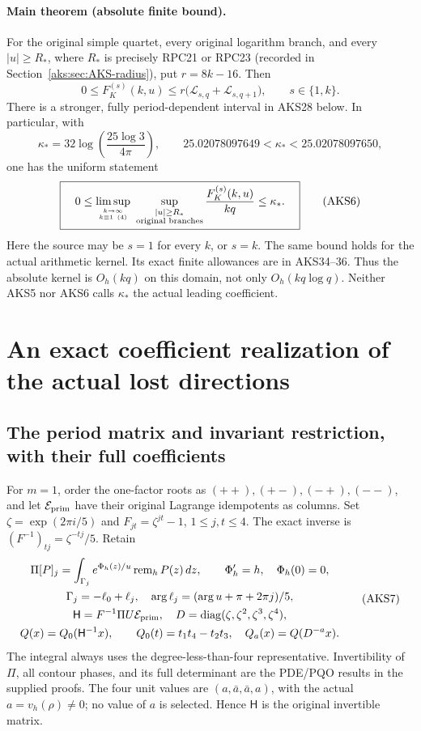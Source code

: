 \paragraph{Main theorem (absolute finite bound).}
For the original simple quartet, every original logarithm branch, and
every $|u|\ge R_*$, where $R_*$ is precisely RPC21 or RPC23 (recorded in
Section~\ref{aks:sec:AKS-radius}), put $r=8k-16$. Then
\[
 \boxed{\quad
 0\le F_K^{(s)}(k,u)\le r\bigl(\mathcal L_{s,q}+\mathcal L_{s,q+1}\bigr),
 \qquad s\in\{1,k\}.\quad}
 \tag{AKS4}
\]
There is a stronger, fully period-dependent interval in AKS28 below.
In particular, with
\[
 \kappa_* =32\log\left(\frac{25\log3}{4\pi}\right),
 \qquad 25.02078097649<\kappa_*<25.02078097650,
 \tag{AKS5}
\]
one has the uniform statement
\[
 \boxed{\quad
 0\le\limsup_{k\to\infty\atop k\equiv1\ (4)}
       \ \sup_{\substack{|u|\ge R_*\\\text{original branches}}}
         \frac{F_K^{(s)}(k,u)}{kq}\le\kappa_*.
 \quad}\tag{AKS6}
\]
Here the source may be $s=1$ for every $k$, or $s=k$. The same bound holds
for the actual arithmetic kernel. Its exact finite allowances are in
AKS34--36. Thus the absolute kernel is $O_h(kq)$ on this domain, not only
$O_h(kq\log q)$. Neither AKS5 nor AKS6 calls $\kappa_*$ the actual leading
coefficient.

\section{An exact coefficient realization of the actual lost directions}
\label{aks:sec:AKS-frame}

\subsection{The period matrix and invariant restriction, with their full coefficients}
For $m=1$, order the one-factor roots as $(++),(+-),(-+),(--)$, and let
$\mathcal E_{\rm prim}$ have their original Lagrange idempotents as columns.
Set $\zeta=\exp(2\pi i/5)$ and $F_{jt}=\zeta^{jt}-1$, $1\le j,t\le4$.
The exact inverse is $(F^{-1})_{tj}=\zeta^{-tj}/5$. Retain
\[
\begin{gathered}
 \Pi[P]_j=\int_{\Gamma_j}e^{\Phi_h(z)/u}\operatorname{rem}_hP(z)\,dz,
 \qquad\Phi_h'=h,\quad\Phi_h(0)=0,\\
 \Gamma_j=-\ell_0+\ell_j,\quad
 \arg\ell_j=(\arg u+\pi+2\pi j)/5,\\
 \mathsf H=F^{-1}\Pi U\mathcal E_{\rm prim},\quad
 D=\operatorname{diag}(\zeta,\zeta^2,\zeta^3,\zeta^4),\\
 Q(x)=Q_0(\mathsf H^{-1}x),\qquad
 Q_0(t)=t_1t_4-t_2t_3,\quad Q_a(x)=Q(D^{-a}x).
\end{gathered}\tag{AKS7}
\]
The integral always uses the degree-less-than-four representative.
Invertibility of $\Pi$, all contour phases, and its full determinant are
the PDE/PQO results in the supplied proofs. The four unit values are
$(a,\bar a,\bar a,a)$, with the actual $a=v_h(\rho)\ne0$; no value of $a$
is selected. Hence $\mathsf H$ is the original invertible matrix.

